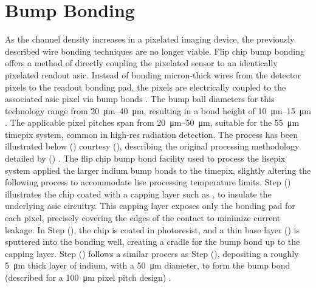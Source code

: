 \documentclass[../../main.tex]{subfiles}
\begin{document}
%
    \section{Bump Bonding}%
    \label{app:thin-film-processing:bump-bonding}%
    As the channel density increases in a pixelated imaging device, the previously described wire bonding techniques are no longer viable.
    Flip chip bump bonding offers a method of directly coupling the pixelated sensor to an identically pixelated readout \gls{asic}.    
    Instead of bonding micron-thick wires from the detector pixels to the readout bonding pad, the pixels are electrically coupled to the associated \gls{asic} pixel via bump bonds \cite{Alimonti_2006,Alimonti_2013}.
    The bump ball diameters for this technology range from \SIrange{20}{40}{\micro\meter}, resulting in a bond height of \SIrange{10}{15}{\micro\meter} \cite{Adam_1999}.
    The applicable pixel pitches span from \SIrange{20}{50}{\micro\meter}, suitable for the \SI{55}{\micro\meter} \gls{timepix} system, common in \gls{high-res} radiation detection.
    The process has been illustrated below () courtesy \citeauthor*{book:Rossi_2006} (\citeyear*{book:Rossi_2006}), describing the original processing methodology detailed by \citeauthor*{Broennimann_2006} (\citeyear*{Broennimann_2006}) \cite{book:Rossi_2006, Broennimann_2006}.
    The flip chip bump bond facility used to process the \gls{lisepix} system applied the larger indium bump bonds to the \gls{timepix}, slightly altering the following process to accommodate \gls{lise} processing temperature limits.
    Step () illustrates the chip coated with a capping layer such as , to insulate the underlying \gls{asic} circuitry.
    This capping layer exposes only the bonding pad for each pixel, precisely covering the edges of the contact to minimize current leakage.
    In Step (), the chip is coated in photoresist, and a thin base layer () is sputtered into the bonding well, creating a cradle for the bump bond up to the capping layer.
    Step () follows a similar process as Step (), depositing a roughly \SI{5}{\micro\meter} thick layer of indium, with a \SI{50}{\micro\meter} diameter, to form the bump bond (described for a \SI{100}{\micro\meter} pixel pitch design) \cite{book:Rossi_2006}.
\end{document}

